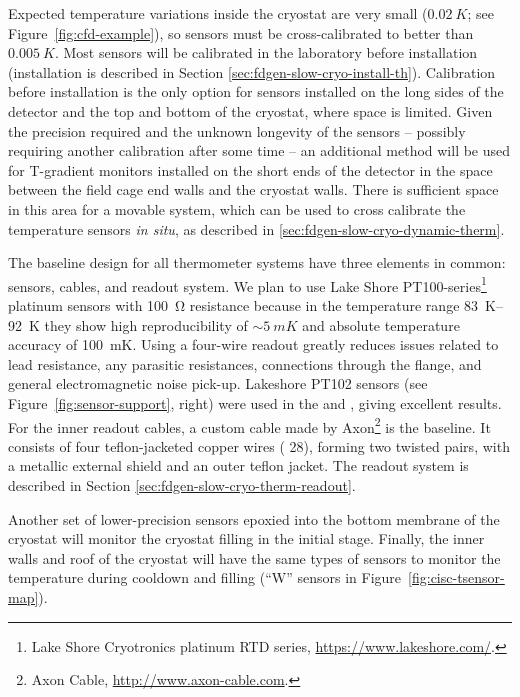Expected temperature variations inside the cryostat are very small ($\SI{0.02}{K}$; see Figure~\ref{fig:cfd-example}),
so sensors must be cross-calibrated to better than $\SI{0.005}{K}$. Most sensors will be calibrated in the laboratory before installation
(installation is described in Section \ref{sec:fdgen-slow-cryo-install-th}).
Calibration before installation is the only option for sensors installed on the long sides of the detector and the top and bottom of the cryostat, where space is limited.
Given the precision required and the unknown longevity of the sensors -- possibly requiring another  calibration after some time -- an additional method
will be used for T-gradient monitors installed on the short ends of the detector in the space between the field cage end walls and the cryostat walls. There is sufficient space in this area for a movable system, which can be used to cross calibrate
the temperature sensors {\em in situ}, as described in \ref{sec:fdgen-slow-cryo-dynamic-therm}.

The baseline design for all thermometer systems have three elements in
common: sensors, cables, and readout system. We plan to use Lake Shore
PT100-series\footnote{Lake Shore Cryotronics\texttrademark{} platinum RTD series,
  \url{https://www.lakeshore.com/}.} %
platinum sensors with \SI{100}{\ohm} resistance %
because in
the temperature range \SIrange{83}{92}{K} %
they 
show high reproducibility of $\sim\SI{5}{mK}$ and absolute temperature
accuracy of \SI{100}{mK}.  Using a four-wire readout greatly reduces
issues related to lead resistance, any parasitic resistances,
connections through the flange, and general electromagnetic noise
pick-up. Lakeshore PT102 sensors (see
Figure~\ref{fig:sensor-support}, right) were used in the  and , %
giving excellent results. For the inner
readout cables, a custom cable made by Axon\footnote{Axon\texttrademark{} Cable, \url{http://www.axon-cable.com}.}
is the baseline. It
consists of four teflon-jacketed copper wires ( 28), forming two
twisted pairs, with a metallic external shield and an outer teflon
jacket.
The readout system is described in Section \ref{sec:fdgen-slow-cryo-therm-readout}.

Another set of lower-precision sensors epoxied into the bottom membrane of the cryostat will monitor  the cryostat filling in the initial stage.   
Finally, the inner walls and roof of the cryostat will have the same types of sensors to monitor the temperature during cooldown and filling (``W'' sensors in Figure~\ref{fig:cisc-tsensor-map}).
 

